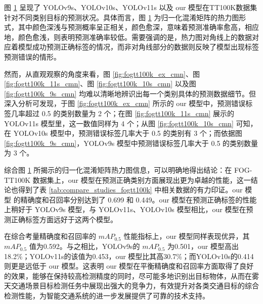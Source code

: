 \begin{figure}[H]
{        }
    \captionsetup{font=footnotesize}
    \label{fig:fogtt100k_cmn}
\end{figure}


图 \ref{fig:fogtt100k_cmn} 呈现了 YOLOv9s、YOLOv10s、YOLOv11s 以及 our 模型在TT100K数据集针对不同类别目标的预测状况。具体而言，图 \ref{fig:fogtt100k_cmn} 为归一化混淆矩阵的热力图形式，其中颜色深浅与预测概率呈正相关，颜色愈深，意味着预测准确率愈高，相应地，颜色愈浅，则表明预测准确率较低。需要强调的是，热力图对角线上的数据对应着模型成功预测正确标签的情况，而非对角线部分的数据则反映了模型出现标签预测错误的情形。

然而，从直观观察的角度来看，图 \ref{fig:fogtt100k_ex_cmn}、图 \ref{fig:fogtt100k_11s_cmn}、图 \ref{fig:fogtt100k_10s_cmn} 以及图 \ref{fig:fogtt100k_9s_cmn} 均难以清晰地辨识出每一个类别具体的预测数据细节。但深入分析可发现，于图 \ref{fig:fogtt100k_ex_cmn} 所示的 our 模型中，预测错误标签几率超过 0.5 的类别数量为 2 个；在图 \ref{fig:fogtt100k_11s_cmn} 展示的 YOLOv11s 模型里，这一数值同样为 4 个；从图 \ref{fig:fogtt100k_10s_cmn} 可知，在 YOLOv10s 模型中，预测错误标签几率大于 0.5 的类别有 3 个；而依据图 \ref{fig:fogtt100k_9s_cmn}，YOLOv9s 模型中预测错误标签几率大于 0.5 的类别数量为 3 个。

综合图 \ref{fig:fogtt100k_cmn} 所揭示的归一化混淆矩阵热力图信息，可以明确地得出结论：在 FOG-TT100K 数据集上，our 模型在预测正确类别方面展现出更为卓越的性能，这一结论也得到了表 \ref{tab:compare_studies_fogtt100k} 中相关数据的有力印证。our 模型 的精确度和召回率分别达到了 0.699 和 0.449。our 模型在预测正确标签的性能上稍好于 YOLOv9s 模型，与 YOLOv11s、YOLOv10s 模型相比，our 模型在预测正确标签方面远好于这两个模型。

在综合考量精确度和召回率的 $mAP_{0.5}$ 性能指标上，our 模型同样表现优异，其 $mAP_{0.5}$ 值为0.592。与之相比，YOLOv9s的 $mAP_{0.5}$ 为0.501，our 模型高出18.2\%；YOLOv11s的该值为0.453，our 模型比其高30.7\%；而YOLOv10s的0.414则更是远低于 our 模型。这表明 our 模型在平衡精确度和召回率方面取得了良好的效果，能够在保持较高检测精度的同时，尽可能多地识别出目标物体，从而在雾天交通场景目标检测任务中展现出强大的竞争力，有效提升对各类交通目标的综合检测性能，为智能交通系统的进一步发展提供了可靠的技术支持。

